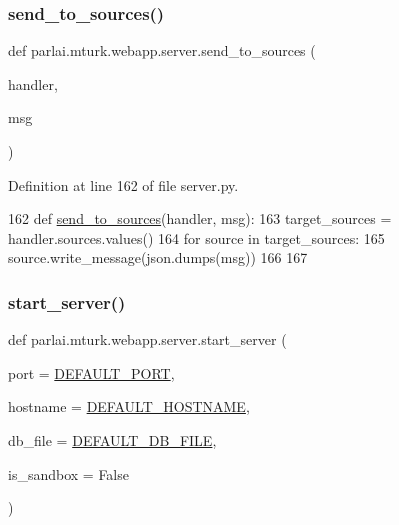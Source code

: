 \subsubsection{\texorpdfstring{send\+\_\+to\+\_\+sources()}{send\_to\_sources()}}
{\footnotesize\ttfamily def parlai.\+mturk.\+webapp.\+server.\+send\+\_\+to\+\_\+sources (\begin{DoxyParamCaption}\item[{}]{handler,  }\item[{}]{msg }\end{DoxyParamCaption})}



Definition at line 162 of file server.\+py.


\begin{DoxyCode}
162 \textcolor{keyword}{def }\hyperlink{namespaceparlai_1_1mturk_1_1webapp_1_1server_a12f6bdadae00003ac87686d5fd7a26df}{send\_to\_sources}(handler, msg):
163     target\_sources = handler.sources.values()
164     \textcolor{keywordflow}{for} source \textcolor{keywordflow}{in} target\_sources:
165         source.write\_message(json.dumps(msg))
166 
167 
\end{DoxyCode}
\mbox{\label{namespaceparlai_1_1mturk_1_1webapp_1_1server_a3faf7a84baf92a6b0863ab87a0015c41}} 
\subsubsection{\texorpdfstring{start\+\_\+server()}{start\_server()}}
{\footnotesize\ttfamily def parlai.\+mturk.\+webapp.\+server.\+start\+\_\+server (\begin{DoxyParamCaption}\item[{}]{port = {\ttfamily \hyperlink{namespaceparlai_1_1mturk_1_1webapp_1_1server_ab2dbe49416f69522010b6c9a211af0e3}{D\+E\+F\+A\+U\+L\+T\+\_\+\+P\+O\+RT}},  }\item[{}]{hostname = {\ttfamily \hyperlink{namespaceparlai_1_1mturk_1_1webapp_1_1server_a2550c6dcb402e3b6b2f52229e848d6a7}{D\+E\+F\+A\+U\+L\+T\+\_\+\+H\+O\+S\+T\+N\+A\+ME}},  }\item[{}]{db\+\_\+file = {\ttfamily \hyperlink{namespaceparlai_1_1mturk_1_1webapp_1_1server_a7d1b65251987c39df64aeb32f36f6a9f}{D\+E\+F\+A\+U\+L\+T\+\_\+\+D\+B\+\_\+\+F\+I\+LE}},  }\item[{}]{is\+\_\+sandbox = {\ttfamily False} }\end{DoxyParamCaption})}



